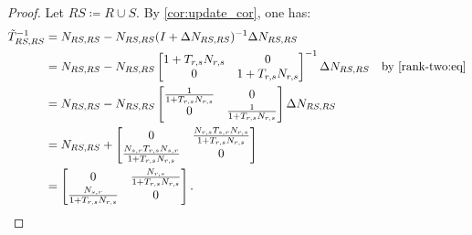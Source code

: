 \begin{proof}
Let \(RS \coloneqq R \cup S\).
By \cref{cor:update_cor}, one has:
\begin{align*}
  \tilde{T}^{-1}_{RS, RS} &= N_{RS, RS} - N_{RS, RS} (I + \Delta N_{RS, RS})^{-1} \Delta N_{RS, RS} & \\
                          &= N_{RS, RS} - N_{RS, RS} \begin{bmatrix} 1 + T_{r, s} N_{r, s} & 0 \\ 0 & 1 + T_{r, s} N_{r, s} \end{bmatrix}^{-1} \Delta N_{RS, RS} & \text{by \eqref{rank-two:eq}} \\
                     &= N_{RS, RS} - N_{RS, RS} \begin{bmatrix} \frac{1}{1 + T_{r, s} N_{r, s}} & 0 \\ 0 & \frac{1}{1 + T_{r, s} N_{r, s}} \end{bmatrix} \Delta N_{RS, RS} &\\
                     &= N_{RS, RS} + \begin{bmatrix} 0 & \frac{N_{r, s}T_{s, r}N_{r, s}}{1 + T_{r, s} N_{r, s}} \\ \frac{N_{s, r}T_{r, s}N_{s, r}}{1 + T_{r, s} N_{r, s}} & 0 \end{bmatrix} & \\
                     &= \begin{bmatrix} 0 & \frac{N_{r, s}}{1 + T_{r, s} N_{r, s}} \\ \frac{N_{s, r}}{1 + T_{r, s} N_{r, s}} & 0 \end{bmatrix}. \qedhere &
\end{align*}
\end{proof}

